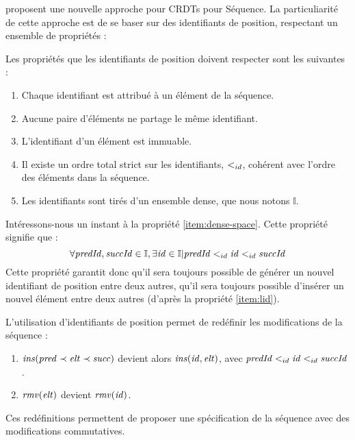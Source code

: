 \cite{2007-crdt-shapiro, 2009-treedoc-preguica} proposent une nouvelle approche pour CRDTs pour Séquence.
La particuliarité de cette approche est de se baser sur des identifiants de position, respectant un ensemble de propriétés :
\begin{definition}
  \label{def:dense-ids}
  Les propriétés que les identifiants de position doivent respecter sont les suivantes :
  \begin{enumerate}
    \item Chaque identifiant est attribué à un élément de la séquence.
    \item \label{item:uniqueness}
      Aucune paire d'éléments ne partage le même identifiant.
    \item L'identifiant d'un élément est immuable.
    \item \label{item:lid}
      Il existe un ordre total strict sur les identifiants, $<_{id}$, cohérent avec l'ordre des éléments dans la séquence.
    \item \label{item:dense-space}
      Les identifiants sont tirés d'un ensemble dense, que nous notons $\mathbb{I}$.
  \end{enumerate}
\end{definition}

Intéressons-nous un instant à la propriété \ref{item:dense-space}.
Cette propriété signifie que :
\begin{equation*}
  \forall \mathit{predId}, \mathit{succId} \in \mathbb{I}, \exists \mathit{id} \in \mathbb{I} | \mathit{predId} <_{id} \mathit{id} <_{id} \mathit{succId}
\end{equation*}
Cette propriété garantit donc qu'il sera toujours possible de générer un nouvel identifiant de position entre deux autres, \ie qu'il sera toujours possible d'insérer un nouvel élément entre deux autres (d'après la propriété \ref{item:lid}).

L'utilisation d'identifiants de position permet de redéfinir les modifications de la séquence :
\begin{enumerate}
  \item $\mathit{ins}(\mathit{pred} \prec \mathit{elt} \prec \mathit{succ})$ devient alors $\mathit{ins}(\mathit{id}, \mathit{elt})$, avec $\mathit{predId} <_{id} \mathit{id} <_{id} \mathit{succId}$.
  \item $\mathit{rmv}(\mathit{elt})$ devient $\mathit{rmv}(\mathit{id})$.
\end{enumerate}
Ces redéfinitions permettent de proposer une spécification de la séquence avec des modifications commutatives.

